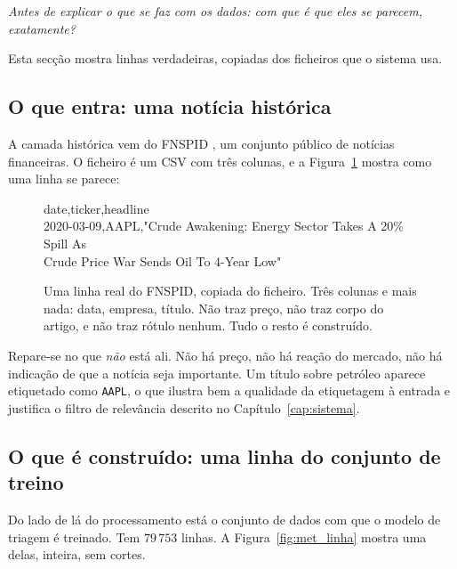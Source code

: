 \emph{Antes de explicar o que se faz com os dados: com que é que eles se parecem, exatamente?}

Esta secção mostra linhas verdadeiras, copiadas dos ficheiros que o sistema usa.

\subsection{O que entra: uma notícia histórica}

A camada histórica vem do \gls{FNSPID} \autocite{dong2024fnspid}, um conjunto público de notícias
financeiras. O ficheiro é um \gls{CSV} com três colunas, e a Figura~\ref{fig:met_fnspid} mostra como
uma linha se parece:

\begin{figure}[ht]
\centering
\begin{tcolorbox}[colback=black!3, colframe=black!30, boxrule=0.4pt, arc=2pt,
                  width=0.96\textwidth, fontupper=\ttfamily\footnotesize]
date,ticker,headline\\
2020-03-09,AAPL,"Crude Awakening: Energy Sector Takes A 20\% Spill As\\
\hspace*{2em}Crude Price War Sends Oil To 4-Year Low"
\end{tcolorbox}
\caption[Uma linha do conjunto de dados histórico]{Uma linha real do \gls{FNSPID}, copiada do
ficheiro. Três colunas e mais nada: data, empresa, título. Não traz preço, não traz corpo do
artigo, e não traz rótulo nenhum. Tudo o resto é construído.}
\label{fig:met_fnspid}
\end{figure}

Repare-se no que \emph{não} está ali. Não há preço, não há reação do mercado, não há indicação de
que a notícia seja importante. Um título sobre petróleo aparece etiquetado como \texttt{AAPL},
o que ilustra bem a qualidade da etiquetagem à entrada e justifica o filtro de relevância descrito
no Capítulo~\ref{cap:sistema}.

\subsection{O que é construído: uma linha do conjunto de treino}

Do lado de lá do processamento está o conjunto de dados com que o modelo de triagem é treinado.
Tem $79\,753$ linhas. A Figura~\ref{fig:met_linha} mostra uma delas, inteira, sem cortes.


